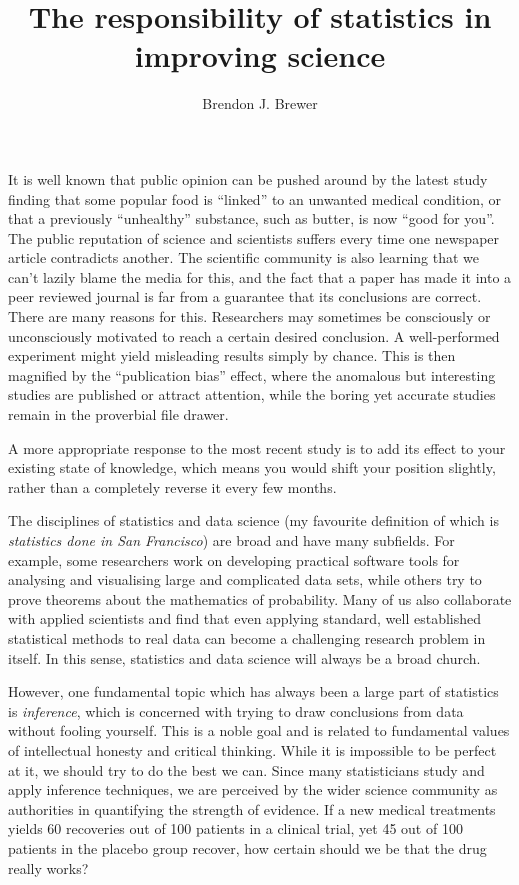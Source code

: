 \documentclass[a4paper, 12pt]{article}
\title{The responsibility of statistics in improving science}
\author{Brendon J. Brewer}
\begin{document}
\sffamily
\maketitle

It is well known that public opinion can be pushed around by the latest study
finding that some popular food is ``linked'' to an unwanted medical condition,
or that a previously ``unhealthy'' substance, such as butter, is now
``good for you''. The public reputation of science and scientists suffers every
time one newspaper article contradicts another.
The scientific community is also learning that we can't lazily blame the media for this, and the fact that a paper has made it into a peer
reviewed journal is far from a guarantee that its conclusions are correct.
There are many reasons for this. Researchers may sometimes be consciously or
unconsciously motivated to reach a certain desired conclusion.
A well-performed experiment might yield
misleading results simply by chance. This is then magnified by the
``publication bias'' effect, where the anomalous but interesting studies
are published or attract attention, while the boring yet accurate studies
remain in the proverbial file drawer.

A more appropriate response to the most recent study is
to add its effect to your existing state of knowledge,
which means you would shift your position slightly,
rather than a completely reverse it every few months.


The disciplines of statistics and data science
(my favourite definition of which is {\em statistics done in San Francisco})
are broad and have many subfields. For example, some researchers
work on developing practical software tools for analysing and visualising large and
complicated data sets, while others try to prove theorems about the mathematics
of probability. Many of us also collaborate with applied scientists and find
that even applying standard, well established statistical methods to
real data can become a challenging research problem in itself. In this sense,
statistics and data science will always be a broad church.

However, one fundamental topic which has always been a large part of
statistics is {\em inference}, which is concerned with trying to
draw conclusions from data without fooling yourself. This is a noble goal
and is related to fundamental values of intellectual honesty and critical
thinking. While
it is impossible to be perfect at it, we should try to do the best
we can. Since many statisticians study and apply inference techniques,
we are perceived by the wider science community as authorities
in quantifying the strength of evidence. If a new medical treatments yields 60
recoveries out of 100 patients in a clinical trial, yet 45 out of 100 patients
in the placebo group recover, how certain should we be that the drug really works?
\end{document}
